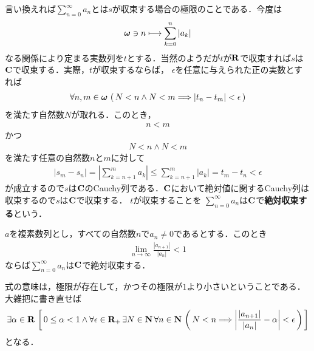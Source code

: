 	言い換えれば$\sum_{n=0}^\infty a_n$とは$s$が収束する場合の極限のことである．今度は
	\begin{align}
		{\boldsymbol \omega} \ni n \longmapsto \sum_{k=0}^n |a_k|
	\end{align}
	なる関係により定まる実数列を$t$とする．当然のようだが$t$が$\mathbf{R}$で収束すれば$s$は$\mathbf{C}$で収束する．実際，$t$が収束するならば，
	$\epsilon$を任意に与えられた正の実数とすれば
	\begin{align}
		\forall n,m \in {\boldsymbol \omega}\, \left(\, N < n \wedge N < m \Longrightarrow 
		|t_n - t_m| < \epsilon\, \right)
	\end{align}
	を満たす自然数$N$が取れる．このとき，
	\begin{align}
		n < m
	\end{align}
	かつ
	\begin{align}
		N < n \wedge N < m
	\end{align}
	を満たす任意の自然数$n$と$m$に対して
	\begin{align}
		|s_m - s_n| = \left|\sum_{k=n+1}^m a_k\right| \leq \sum_{k=n+1}^m |a_k| = t_m - t_n < \epsilon
	\end{align}
	が成立するので$s$は$\mathbf{C}$のCauchy列である．$\mathbf{C}$において絶対値に関するCauchy列は収束するので$s$は$\mathbf{C}$で収束する．
	$t$が収束することを
	$\sum_{n=0}^\infty a_n$は$\mathbf{C}$で{\bf 絶対収束する}という．
	
	\begin{screen}
		\begin{thm}[d'Alembertの収束判定法]
			$a$を複素数列とし，すべての自然数$n$で$a_n \neq 0$であるとする．このとき
			\begin{align}
				\lim_{n \to \infty} \frac{|a_{n+1}|}{|a_n|} < 1
			\end{align}
			ならば$\sum_{n=0}^\infty a_n$は$\mathbf{C}$で絶対収束する．
		\end{thm}
	\end{screen}
	
	式の意味は，極限が存在して，かつその極限が$1$より小さいということである．大雑把に書き直せば
	\begin{align}
		\exists \alpha \in \mathbf{R}\, \left[\, 
		0 \leq \alpha < 1 \wedge \forall \epsilon \in \mathbf{R}_+\, \exists N \in \mathbf{N}\, \forall n \in \mathbf{N}\,
		\left(\, N < n \Longrightarrow \left|\frac{|a_{n+1}|}{|a_n|} - \alpha\right| < \epsilon\, \right)\, \right]
	\end{align}
	となる．
	
